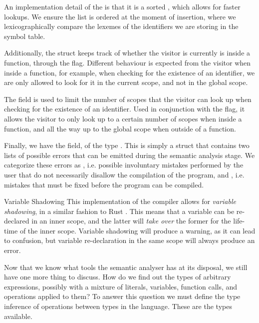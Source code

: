 An implementation detail of the  is that it is a sorted
, which allows for faster lookups. We ensure the list is
ordered at the moment of insertion, where we lexicographically compare the
lexemes of the identifiers we are storing in the symbol table.


Additionally, the  struct keeps track of whether the
visitor is currently is inside a function, through the 
flag. Different behaviour is expected from the visitor when inside a function,
for example, when checking for the existence of an identifier, we are only
allowed to look for it in the current scope, and not in the global scope.

The  field is used to limit the number of scopes that
the visitor can look up when checking for the existence of an identifier. Used
in conjunction with the  flag, it allows the visitor to
only look up to a certain number of scopes when inside a function, and all the
way up to the global scope when outside of a function.

Finally, we have the  field, of the type .
This is simply a struct that contains two lists of possible errors that can be
emitted during the semantic analysis stage. We categorize these errors as
, i.e. possible involuntary mistakes performed by the user that
do not necessarily disallow the compilation of the program, and ,
i.e. mistakes that must be fixed before the program can be compiled.

\vfill

\begin{warningbox}{Variable Shadowing}
    This implementation of the  compiler allows for \textit{variable
        shadowing}, in a similar fashion to Rust \cite{rustlangScopeShadowing}.  This means that a variable
    can be re-declared in an inner scope, and the latter will \textit{take over}
    the former for the life-time of the inner scope. Variable shadowing will
    produce a warning, as it can lead to confusion, but variable re-declaration
    in the same scope will always produce an error.
\end{warningbox}

\vfill
\newpage

Now that we know what tools the semantic analyser has at its disposal, we still
have one more thing to discuss. How do we find out the types of arbitrary
expressions, possibly with a mixture of literals, variables, function calls, and
operations applied to them? To answer this question we must define the type
inference of operations between types in the language. These are the types available.


